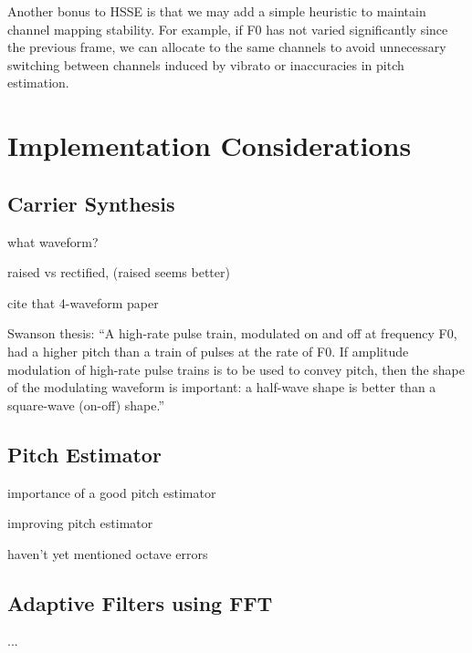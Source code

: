 \documentclass [11pt, proquest,oneside] {ganter_thesis}[2015/03/03]
\begin{document}
Another bonus to HSSE is that we may add a simple heuristic to maintain channel mapping stability.  For example, if F0 has not varied significantly since the previous frame, we can allocate to the same channels to avoid unnecessary switching between channels induced by vibrato or inaccuracies in pitch estimation.




\section{Implementation Considerations}

\subsection{Carrier Synthesis}

what waveform?

raised vs rectified, (raised seems better)

cite that 4-waveform paper

Swanson thesis: ``A high-rate pulse train, modulated on and off at frequency F0, had a higher pitch than a train of pulses at the rate of F0. If amplitude modulation of high-rate pulse trains is to be used to convey pitch, then the shape of the modulating waveform is important: a half-wave shape is better than a square-wave (on-off) shape.''

\subsection{Pitch Estimator}

importance of a good pitch estimator

improving pitch estimator

haven't yet mentioned octave errors

\subsection{Adaptive Filters using FFT}

...
\end{document}
